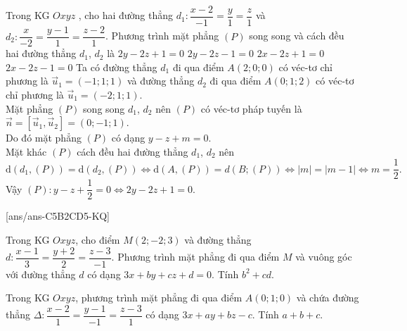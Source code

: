 \begin{ex}%
Trong KG $Oxyz$ , cho hai đường thẳng $d_1\colon\dfrac{x-2}{-1}=\dfrac{y}{1}=\dfrac{z}{1}$ và $d_2\colon\dfrac{x}{-2}=\dfrac{y-1}{1}=\dfrac{z-2}{1}$. Phương trình mặt phẳng $(P)$ song song và cách đều hai đường thẳng $d_1$, ${d_2}$ là
\choice
{\True $ 2y-2z+1=0$}
{$ 2y-2z-1=0$}
{$2x-2z+1=0$}
{$2x-2z-1=0$}
\loigiai
{
Ta có đường thẳng $d_1$ đi qua điểm $ A(2;0;0)$ có véc-tơ chỉ phương là $\overrightarrow{u}_1=(-1;1;1)$ và đường thẳng $d_2$ đi qua điểm $ A(0;1;2)$ có véc-tơ chỉ phương là $\overrightarrow{u}_1=(-2; 1; 1)$.\\
Mặt phẳng $(P)$ song song $d_1$, ${d_2}$ nên $(P)$ có véc-tơ pháp tuyến là $\overrightarrow{n}=\left[\overrightarrow{u}_1,\overrightarrow{u}_2\right]=(0;-1;1)$.\\
Do đó mặt phẳng $(P)$ có dạng $ y-z+m=0$.\\
Mặt khác $(P)$ cách đều hai đường thẳng $d_1$, ${d_2}$ nên\\
$$ \mathrm{d}\left(d_1,(P)\right)=\mathrm{d}\left(d_2,(P)\right)\Leftrightarrow \mathrm{d}\left(A,(P)\right)=d\left(B;(P)\right)\Leftrightarrow\left| m\right|=\left| m-1\right|\Leftrightarrow m=\dfrac{1}{2}.$$
Vậy $(P)\colon y-z+\dfrac{1}{2}=0\Leftrightarrow 2y-2z+1=0$.}
\end{ex}
\TNSA
{}[ans/ans-C5B2CD5-KQ]
\begin{ex}%
Trong KG $Oxyz$, cho điểm $M(2; -2; 3)$ và đường thẳng \break $d\colon \dfrac{x-1}{3}=\dfrac{y+2}{2}=\dfrac{z-3}{-1}$. Phương trình mặt phẳng đi qua điểm $M$ và vuông góc với đường thẳng $d$ có dạng $3x+by+cz+d=0$. Tính $b^2+cd$.
\end{ex}

\begin{ex}%
Trong KG $Oxyz$, phương trình mặt phẳng đi qua điểm $A(0; 1; 0)$ và chứa đường thẳng $\Delta\colon \dfrac{x-2}{1}=\dfrac{y-1}{-1}=\dfrac{z-3}{1}$ có dạng $3x+ay+bz-c$. Tính $a+b+c$.
\end{ex}

